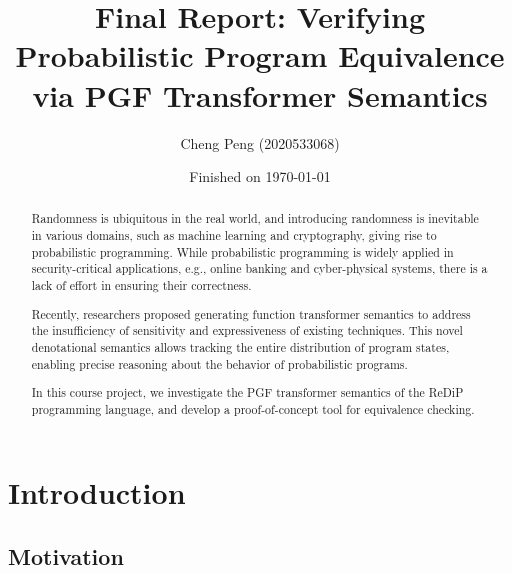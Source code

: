 \documentclass[a4paper]{article}
\title{Final Report: Verifying Probabilistic Program Equivalence via PGF Transformer Semantics}
\date{Finished on \today}
\author{Cheng Peng (2020533068)}
\begin{document}
\maketitle

\begin{abstract}
	Randomness is ubiquitous in the real world, and introducing randomness is inevitable in various domains, such as machine learning and cryptography, giving rise to probabilistic programming.
	While probabilistic programming is widely applied in security-critical applications, e.g., online banking and cyber-physical systems, there is a lack of effort in ensuring their correctness.\par
	Recently, researchers proposed generating function transformer semantics to address the insufficiency of sensitivity and expressiveness of existing techniques.
	This novel denotational semantics allows tracking the entire distribution of program states, enabling precise reasoning about the behavior of probabilistic programs.\par
	In this course project, we investigate the PGF transformer semantics of the ReDiP programming language, and develop a proof-of-concept tool for equivalence checking.
\end{abstract}

\section{Introduction}

\subsection{Motivation}
\end{document}
